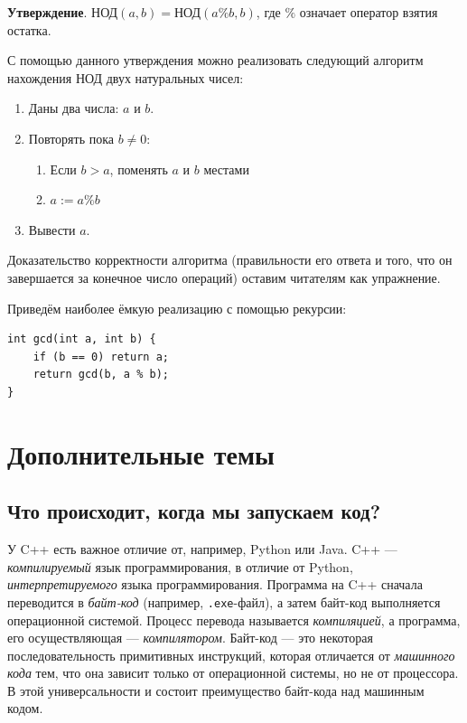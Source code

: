\documentclass{article}
\newcommand{\stat}[1]{\textbf{Утверждение}. #1}
\begin{document}
	\stat{$\text{НОД}(a, b) = \text{НОД}(a \% b, b)$, где $\%$ означает оператор взятия остатка.}
	
	С помощью данного утверждения можно реализовать следующий алгоритм нахождения НОД двух натуральных чисел:
	
	\begin{enumerate}
		\item Даны два числа: $a$ и $b$.
		\item Повторять пока $b \ne 0$:
		
		\begin{enumerate}
			\item Если $b>a$, поменять $a$ и $b$ местами
			\item $a := a \% b$
		\end{enumerate}
		
		\item Вывести $a$.
	\end{enumerate}
	
	Доказательство корректности алгоритма (правильности его ответа и того, что он завершается за конечное число операций) оставим читателям как упражнение.
	
	Приведём наиболее ёмкую реализацию с помощью рекурсии:
	
	\begin{lstlisting}
int gcd(int a, int b) {
	if (b == 0) return a;
	return gcd(b, a % b);
}
	\end{lstlisting}
	
	\section{Дополнительные темы}
	
	\subsection{Что происходит, когда мы запускаем код?}
	
	У C++ есть важное отличие от, например, Python или Java. C++ --- \textit{компилируемый} язык программирования, в отличие от Python, \textit{интерпретируемого} языка программирования. Программа на C++ сначала переводится в \textit{байт-код} (например, \texttt{.exe}-файл), а затем байт-код выполняется операционной системой. Процесс перевода называется \textit{компиляцией}, а программа, его осуществляющая --- \textit{компилятором}. Байт-код --- это некоторая последовательность примитивных инструкций, которая отличается от \textit{машинного кода} тем, что она зависит только от операционной системы, но не от процессора. В этой универсальности и состоит преимущество байт-кода над машинным кодом.
	
\end{document}
